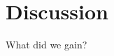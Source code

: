 \documentclass[gmd, manuscript]{copernicus}
\begin{document}
\section{Discussion}
\label{sec:disc}





\conclusions  %
\label{sec:conc}
What did we gain?
















\end{document}
